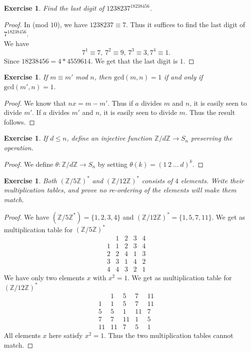 \documentclass[a4paper, 11pt]{book}
\theoremstyle{plain}
\newtheorem{exercise}[theorem]{Exercise}
\theoremstyle{plain}
\begin{document}
\begin{exercise}
Find the last digit of $1238237^{18238456}$.
\end{exercise}
\begin{proof}
In (mod $10$), we have $1238237 \equiv 7$. Thus it suffices to find the last digit of $7^{18238456}$.\\
We have
$$7^1\equiv 7,~7^2\equiv 9,~7^3 \equiv 3, 7^4 \equiv 1.$$
Since $18238456 = 4*4559614 $. We get that the last digit is $1$.
\end{proof}

\begin{exercise}
If $m\equiv m'$ mod $n$, then $\text{gcd}(m,n) = 1$ if and only if $\text{gcd}(m',n)=1$.
\end{exercise}
\begin{proof}
We know that $nx = m - m'$. Thus if $a$ divides $m$ and $n$, it is easily seen to divide $m'$. If $a$ divides $m'$ and $n$, it is easily seen to divide $m$. Thus the result follows.
\end{proof}

\begin{exercise}
If $d\leq n$, define an injective function $\mathbb{Z}/d\mathbb{Z}\rightarrow S_n$ preserving the operation.
\end{exercise}
\begin{proof}
We define $\theta:\mathbb{Z}/d\mathbb{Z}\rightarrow S_n$ by setting $\theta(k) = (1~2~...~d)^k$.
\end{proof}

\begin{exercise}
Both $(\mathbb{Z}/5\mathbb{Z})^*$ and $(\mathbb{Z}/12\mathbb{Z})^*$ consists of $4$ elements. Write their multiplication tables, and prove no re-ordering of the elements will make them match.
\end{exercise}
\begin{proof}
We have $(\mathbb{Z}/5\mathbb{Z}^*)=\{1,2,3,4\}$ and $(\mathbb{Z}/12\mathbb{Z})^* = \{1,5,7,11\}$. We get as multiplication table for $(\mathbb{Z}/5\mathbb{Z})^*$
$$\begin{array}{c|cccc}
  & 1 & 2 & 3 & 4\\
\hline
1 & 1 & 2 & 3 & 4\\
2 & 2 & 4 & 1 & 3\\
3 & 3 & 1 & 4 & 2\\
4 & 4 & 3 & 2 & 1
\end{array}$$
We have only two elements $x$ with $x^2 = 1$. We get as multiplication table for $(\mathbb{Z}/12\mathbb{Z})^*$
$$\begin{array}{c|cccc}
  & 1 & 5 & 7 & 11\\
\hline
1 & 1 & 5 & 7 & 11\\
5 & 5 & 1 & 11 & 7\\
7 & 7 & 11 & 1 & 5\\
11 & 11 & 7 & 5 & 1
\end{array}$$
All elements $x$ here satisfy $x^2 = 1$. Thus the two multiplication tables cannot match.
\end{proof}
\end{document}
